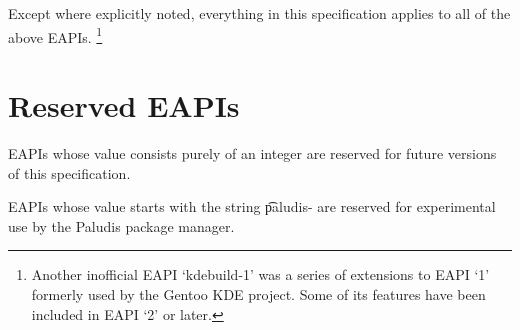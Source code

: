 Except where explicitly noted, everything in this specification
applies to all of the above EAPIs.%
\footnote{Another inofficial EAPI `kdebuild-1' was a series of
    extensions to EAPI `1' formerly used by the Gentoo KDE project.
    Some of its features have been included in EAPI `2' or later.}

\section{Reserved EAPIs}

\begin{compactitem}
\item EAPIs whose value consists purely of an integer are reserved for future versions of this
    specification.
\item EAPIs whose value starts with the string \t{paludis-} are reserved for experimental
    use by the Paludis package manager.
\end{compactitem}


